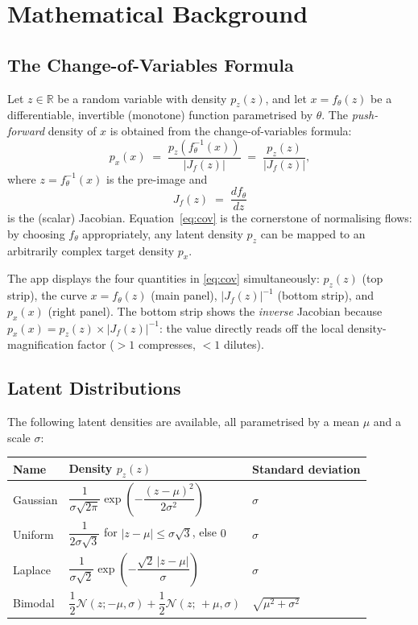 \documentclass[11pt,a4paper]{article}
\newcommand{\R}{\mathbb{R}}
\newcommand{\pz}{p_z}
\newcommand{\px}{p_x}
\newcommand{\ft}{f_{\!\theta}}
\newcommand{\Jf}{J_{\!f}}
\newcommand{\param}{\theta}
\begin{document}
\section{Mathematical Background}

\subsection{The Change-of-Variables Formula}

Let $z \in \R$ be a random variable with density $\pz(z)$, and let
$x = \ft(z)$ be a differentiable, invertible (monotone) function
parametrised by $\param$.  The \emph{push-forward} density of $x$ is
obtained from the change-of-variables formula:
\begin{equation}
  \px(x) \;=\; \frac{\pz\!\left(\ft^{-1}(x)\right)}{|\Jf(z)|}
  \;=\; \frac{\pz(z)}{|\Jf(z)|},
  \label{eq:cov}
\end{equation}
where $z = \ft^{-1}(x)$ is the pre-image and
\begin{equation}
  \Jf(z) \;=\; \frac{d\ft}{dz}
\end{equation}
is the (scalar) Jacobian.  Equation~\eqref{eq:cov} is the cornerstone of
normalising flows: by choosing $\ft$ appropriately, any latent density
$\pz$ can be mapped to an arbitrarily complex target density $\px$.

The app displays the four quantities in \eqref{eq:cov} simultaneously:
$\pz(z)$ (top strip), the curve $x = \ft(z)$ (main panel),
$|\Jf(z)|^{-1}$ (bottom strip), and $\px(x)$ (right panel).
The bottom strip shows the \emph{inverse} Jacobian because
$\px(x) = \pz(z)\times|\Jf(z)|^{-1}$: the value directly reads off the
local density-magnification factor ($>1$ compresses, $<1$ dilutes).

\subsection{Latent Distributions}

The following latent densities are available, all parametrised by a mean
$\mu$ and a scale $\sigma$:

\begin{center}
\renewcommand{\arraystretch}{1.4}
\begin{tabular}{lll}
\toprule
Name & Density $\pz(z)$ & Standard deviation \\
\midrule
Gaussian  & $\dfrac{1}{\sigma\sqrt{2\pi}}\exp\!\left(-\dfrac{(z-\mu)^2}{2\sigma^2}\right)$
           & $\sigma$ \\
Uniform   & $\dfrac{1}{2\sigma\sqrt{3}}$ for $|z-\mu| \le \sigma\sqrt{3}$, else $0$
           & $\sigma$ \\
Laplace   & $\dfrac{1}{\sigma\sqrt{2}}\exp\!\left(-\dfrac{\sqrt{2}\,|z-\mu|}{\sigma}\right)$
           & $\sigma$ \\
Bimodal   & $\dfrac{1}{2}\mathcal{N}(z;-\mu,\sigma)
             +\dfrac{1}{2}\mathcal{N}(z;\,+\mu,\sigma)$
           & $\sqrt{\mu^2+\sigma^2}$ \\
\bottomrule
\end{tabular}
\end{center}
\end{document}
